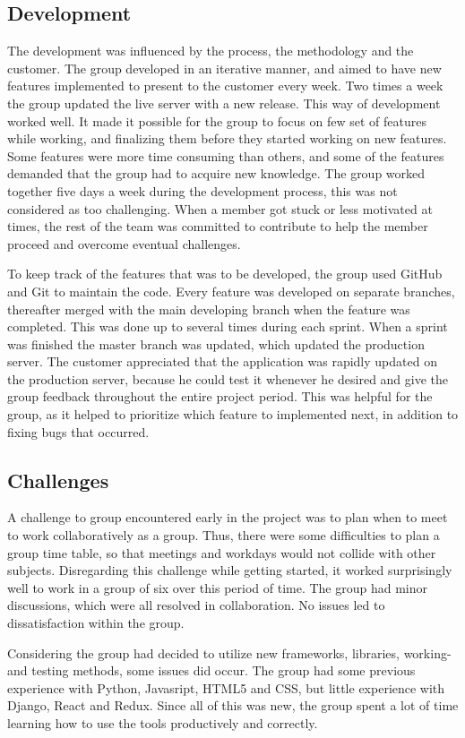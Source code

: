 \subsection{Development}
The development was influenced by the process, the methodology and the customer. The group developed in an iterative manner, and aimed to have new features implemented to present to the customer every week. Two times a week the group updated the live server with a new release. This way of development worked well. It made it possible for the group to focus on few set of features while working, and finalizing them before they started working on new features. Some features were more time consuming than others, and some of the features demanded that the group had to acquire new knowledge. The group worked together five days a week during the development process, this was not considered as too challenging. When a member got stuck or less motivated at times, the rest of the team was committed to contribute to help the member proceed and overcome eventual challenges.

To keep track of the features that was to be developed, the group used GitHub and Git to maintain the code. Every feature was developed on separate branches, thereafter merged with the main developing branch when the feature was completed. This was done up to several times during each sprint. When a sprint was finished the master branch was updated, which updated the production server. The customer appreciated that the application was rapidly updated on the production server, because he could test it whenever he desired and give the group feedback throughout the entire project period. This was helpful for the group, as it helped to prioritize which feature to implemented next, in addition to fixing bugs that occurred.


\subsection{Challenges}
A challenge to group encountered early in the project was to plan when to meet to work collaboratively as a group. Thus, there were some difficulties to plan a group time table, so that meetings and workdays would not collide with other subjects. Disregarding this challenge while getting started, it worked surprisingly well to work in a group of six over this period of time. The group had minor discussions, which were all resolved in collaboration. No issues led to dissatisfaction within the group.

Considering the group had decided to utilize new frameworks, libraries, working- and testing methods, some issues did occur. The group had some previous experience with Python, Javasript, HTML5 and CSS, but little experience with Django, React and Redux. Since all of this was new, the group spent a lot of time learning how to use the tools productively and correctly. 

